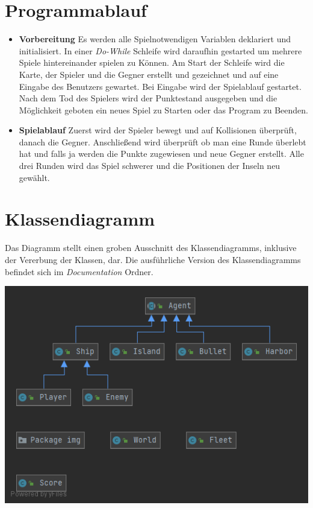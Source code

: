 \documentclass{article}
\begin{document}
\section{Programmablauf}
\begin{itemize}
    \item \textbf{Vorbereitung}
        \newline
        Es werden alle Spielnotwendigen Variablen deklariert und initialisiert. In einer \textit{Do-While} Schleife wird daraufhin gestarted um mehrere Spiele hintereinander spielen zu Können. Am Start der Schleife wird die Karte, der Spieler und die Gegner erstellt und gezeichnet und auf eine Eingabe des Benutzers gewartet. Bei Eingabe wird der Spielablauf gestartet. Nach dem Tod des Spielers wird der Punktestand ausgegeben und die Möglichkeit geboten ein neues Spiel zu Starten oder das Program zu Beenden.
    \item \textbf{Spielablauf}
        \newline
        Zuerst wird der Spieler bewegt und auf Kollisionen überprüft, danach die Gegner. Anschließend wird überprüft ob man eine Runde überlebt hat und falls ja werden die Punkte zugewiesen und neue Gegner erstellt. Alle drei Runden wird das Spiel schwerer und die Positionen der Inseln neu gewählt.
\end{itemize}
\newpage


\newpage
\section{Klassendiagramm}
Das Diagramm stellt einen groben Ausschnitt des Klassendiagramms, inklusive der Vererbung der Klassen, dar. Die ausführliche Version des Klassendiagramms befindet sich im \textit{Documentation} Ordner.
\newline

\includegraphics[width=\textwidth,height=\textheight,keepaspectratio]{./images/Rough_UML.png}
\newpage
\end{document}
